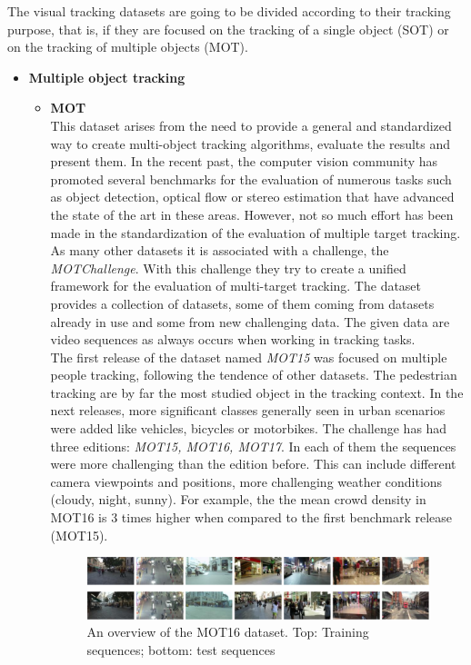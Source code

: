 \documentclass{bmvc2k}
\begin{document}
The visual tracking datasets are going to be divided according to their tracking purpose, that is, if they are focused on the tracking of a single object (SOT) or on the tracking of multiple objects (MOT).
\begin{itemize}
\item \textbf{Multiple object tracking}
\begin{itemize}
\item \textbf{MOT} ~\cite{milan2016mot16}\\
This dataset arises from the need to provide a general and standardized way to create multi-object tracking algorithms, evaluate the results and present them. In the recent past, the computer vision community has promoted several benchmarks for the evaluation of numerous tasks such as object detection, optical flow or stereo estimation that have advanced the state of the art in these areas. However, not so much effort has been made in the standardization of the evaluation of multiple target tracking.\\
As many other datasets it is associated with a challenge, the \textit{MOTChallenge}. With this challenge they try to create a unified framework for the evaluation of multi-target tracking. The dataset provides a collection of datasets, some of them coming from datasets already in use and some from new challenging data. The given data are video sequences as always occurs when working in tracking tasks.\\
The first release of the dataset named \textit{MOT15} was focused on multiple people tracking, following the tendence of other datasets. The pedestrian tracking are by far the most studied object in the tracking context. In the next releases, more significant classes generally seen in urban scenarios were added like vehicles, bicycles or motorbikes. The challenge has had three editions: \textit{MOT15, MOT16, MOT17}. In each of them the sequences were more challenging than the edition before. This can include different camera viewpoints and positions, more challenging weather conditions (cloudy, night, sunny). For example, the the mean crowd density in MOT16 is 3 times higher when compared to the first benchmark release (MOT15).

\begin{figure}[h!]
\begin{center}
\includegraphics[scale=0.3]{mot16.png}
\caption{An overview of the MOT16 dataset. Top: Training sequences; bottom: test sequences ~\cite{milan2016mot16}}
\label{fig:mot}
\end{center}
\end{figure}


\end{itemize}
\end{itemize}
\end{document}
